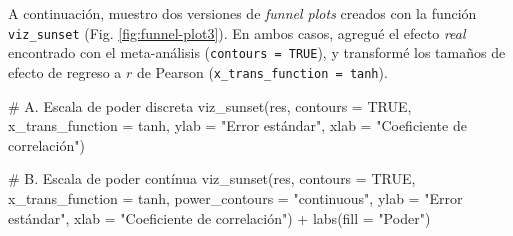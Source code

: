 \documentclass[
  bookmarksnumbered]{article}
\newenvironment{Shaded}{\begin{snugshade}}{\end{snugshade}}
\newcommand{\AttributeTok}[1]{\textcolor[rgb]{0.00,0.34,0.68}{#1}}
\newcommand{\CommentTok}[1]{\textcolor[rgb]{0.54,0.53,0.53}{#1}}
\newcommand{\ConstantTok}[1]{\textcolor[rgb]{0.67,0.33,0.00}{#1}}
\newcommand{\FunctionTok}[1]{\textcolor[rgb]{0.39,0.29,0.61}{#1}}
\newcommand{\NormalTok}[1]{\textcolor[rgb]{0.12,0.11,0.11}{#1}}
\newcommand{\SpecialCharTok}[1]{\textcolor[rgb]{0.24,0.68,0.91}{#1}}
\newcommand{\StringTok}[1]{\textcolor[rgb]{0.75,0.01,0.01}{#1}}
\begin{document}
A continuación, muestro dos versiones de \emph{funnel plots} creados con la función \texttt{viz\_sunset} (Fig. \ref{fig:funnel-plot3}). En ambos casos, agregué el efecto \emph{real} encontrado con el meta-análisis (\texttt{contours\ =\ TRUE}), y transformé los tamaños de efecto de regreso a \(r\) de Pearson (\texttt{x\_trans\_function\ =\ tanh}).

\begin{Shaded}
\begin{Highlighting}[]
\CommentTok{\# A. Escala de poder discreta}
\FunctionTok{viz\_sunset}\NormalTok{(res,}
           \AttributeTok{contours =} \ConstantTok{TRUE}\NormalTok{,}
           \AttributeTok{x\_trans\_function =}\NormalTok{ tanh,}
           \AttributeTok{ylab =} \StringTok{"Error estándar"}\NormalTok{,}
           \AttributeTok{xlab =} \StringTok{"Coeficiente de correlación"}\NormalTok{)}

\CommentTok{\# B. Escala de poder contínua}
\FunctionTok{viz\_sunset}\NormalTok{(res, }
           \AttributeTok{contours =} \ConstantTok{TRUE}\NormalTok{,}
           \AttributeTok{x\_trans\_function =}\NormalTok{ tanh, }
           \AttributeTok{power\_contours =} \StringTok{"continuous"}\NormalTok{,}
           \AttributeTok{ylab =} \StringTok{"Error estándar"}\NormalTok{,}
           \AttributeTok{xlab =} \StringTok{"Coeficiente de correlación"}\NormalTok{) }\SpecialCharTok{+}
  \FunctionTok{labs}\NormalTok{(}\AttributeTok{fill =} \StringTok{"Poder"}\NormalTok{)}
\end{Highlighting}
\end{Shaded}
\end{document}
